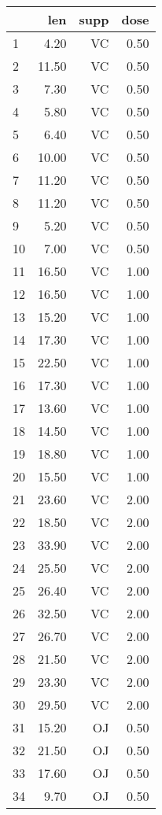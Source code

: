 \documentclass{article}\usepackage[]{graphicx}\usepackage[]{color}
\begin{document}
\begin{table}[ht]
\centering
\begin{tabular}{|l|r|r|r|}
  \hline
 & len & supp & dose \\ 
  \hline
1 & 4.20 & VC & 0.50 \\ 
  2 & 11.50 & VC & 0.50 \\ 
  3 & 7.30 & VC & 0.50 \\ 
  4 & 5.80 & VC & 0.50 \\ 
  5 & 6.40 & VC & 0.50 \\ 
  6 & 10.00 & VC & 0.50 \\ 
  7 & 11.20 & VC & 0.50 \\ 
  8 & 11.20 & VC & 0.50 \\ 
  9 & 5.20 & VC & 0.50 \\ 
  10 & 7.00 & VC & 0.50 \\ 
  11 & 16.50 & VC & 1.00 \\ 
  12 & 16.50 & VC & 1.00 \\ 
  13 & 15.20 & VC & 1.00 \\ 
  14 & 17.30 & VC & 1.00 \\ 
  15 & 22.50 & VC & 1.00 \\ 
  16 & 17.30 & VC & 1.00 \\ 
  17 & 13.60 & VC & 1.00 \\ 
  18 & 14.50 & VC & 1.00 \\ 
  19 & 18.80 & VC & 1.00 \\ 
  20 & 15.50 & VC & 1.00 \\ 
  21 & 23.60 & VC & 2.00 \\ 
  22 & 18.50 & VC & 2.00 \\ 
  23 & 33.90 & VC & 2.00 \\ 
  24 & 25.50 & VC & 2.00 \\ 
  25 & 26.40 & VC & 2.00 \\ 
  26 & 32.50 & VC & 2.00 \\ 
  27 & 26.70 & VC & 2.00 \\ 
  28 & 21.50 & VC & 2.00 \\ 
  29 & 23.30 & VC & 2.00 \\ 
  30 & 29.50 & VC & 2.00 \\ 
  31 & 15.20 & OJ & 0.50 \\ 
  32 & 21.50 & OJ & 0.50 \\ 
  33 & 17.60 & OJ & 0.50 \\ 
  34 & 9.70 & OJ & 0.50 \\ 

\end{tabular}
\end{table}
\end{document}
